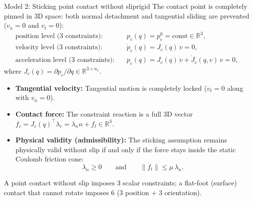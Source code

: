 \documentclass[11pt,a4paper]{article}
\newcommand{\R}{\mathbb{R}}
\newcommand{\Jc}{J_c}
\begin{document}
\begin{definition}{Model 2: Sticking point contact without slip}{rigid}
The contact point is completely pinned in 3D space: both normal detachment and tangential sliding are prevented ($v_n = 0$ and $v_t = 0$):
\begin{align}
  \text{position level ($3$ constraints):}\quad & p_c(q) = p_c^0 = \text{const} \in \R^3, \label{eq:stick_pos}\\
  \text{velocity level ($3$ constraints):}\quad & \dot p_c(q) = \Jc(q)\,v = 0, \label{eq:vel}\\
  \text{acceleration level ($3$ constraints):}\quad & \ddot p_c(q) = \Jc(q)\,\dot v+\dot J_c(q,v)\,v = 0, \label{eq:acc}
\end{align}
where $\Jc(q) = \partial p_c/\partial q \in \R^{3 \times n_v}$.
\begin{itemize}[nosep]
  \item \textbf{Tangential velocity:} Tangential motion is completely locked ($v_t = 0$ along with $v_n = 0$).
  \item \textbf{Contact force:} The constraint reaction is a full 3D vector $f_c = \Jc(q)^\top \lambda_c = \lambda_n n + f_t \in \R^3$.
  \item \textbf{Physical validity (admissibility):} The sticking assumption remains physically valid without slip if and only if the force stays inside the static Coulomb friction cone:
  \[
    \lambda_n \ge 0 \qquad \text{and} \qquad \|f_t\| \le \mu\,\lambda_n.
  \]
\end{itemize}
A point contact without slip imposes $3$ scalar constraints; a flat-foot (surface) contact that cannot rotate imposes $6$ (3 position + 3 orientation).
\end{definition}
\end{document}
